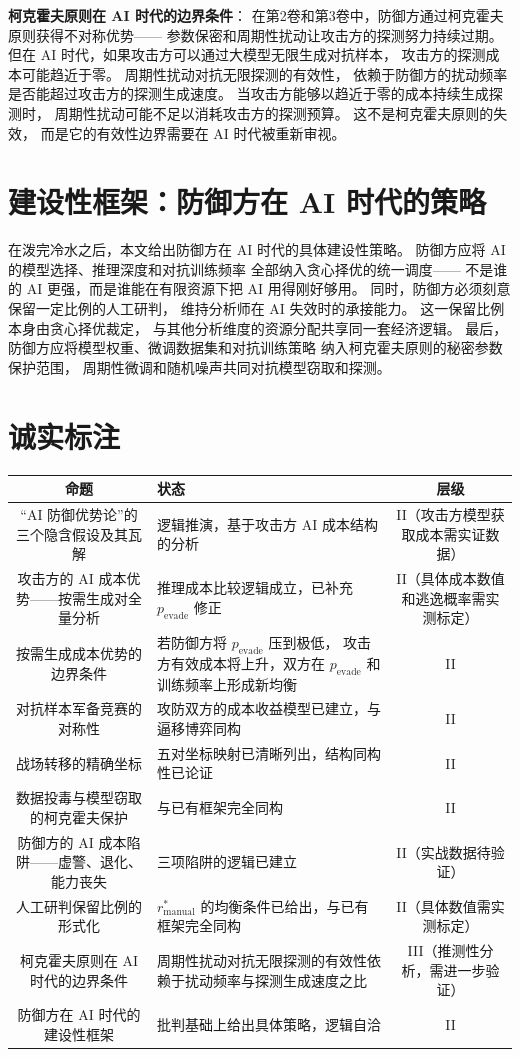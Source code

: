 \documentclass[11pt,a4paper]{article}
\begin{document}
\textbf{柯克霍夫原则在 AI 时代的边界条件}：
在第2卷和第3卷中，防御方通过柯克霍夫原则获得不对称优势——
参数保密和周期性扰动让攻击方的探测努力持续过期。
但在 AI 时代，如果攻击方可以通过大模型无限生成对抗样本，
攻击方的探测成本可能趋近于零。
周期性扰动对抗无限探测的有效性，
依赖于防御方的扰动频率是否能超过攻击方的探测生成速度。
当攻击方能够以趋近于零的成本持续生成探测时，
周期性扰动可能不足以消耗攻击方的探测预算。
这不是柯克霍夫原则的失效，
而是它的有效性边界需要在 AI 时代被重新审视。

\section{建设性框架：防御方在 AI 时代的策略}

在泼完冷水之后，本文给出防御方在 AI 时代的具体建设性策略。
防御方应将 AI 的模型选择、推理深度和对抗训练频率
全部纳入贪心择优的统一调度——
不是谁的 AI 更强，而是谁能在有限资源下把 AI 用得刚好够用。
同时，防御方必须刻意保留一定比例的人工研判，
维持分析师在 AI 失效时的承接能力。
这一保留比例本身由贪心择优裁定，
与其他分析维度的资源分配共享同一套经济逻辑。
最后，防御方应将模型权重、微调数据集和对抗训练策略
纳入柯克霍夫原则的秘密参数保护范围，
周期性微调和随机噪声共同对抗模型窃取和探测。

\section{诚实标注}

\begin{center}
\begin{xltabular}{\textwidth}{c|X|c}
\toprule
\textbf{命题} & \textbf{状态} & \textbf{层级} \\
\midrule
“AI 防御优势论”的三个隐含假设及其瓦解 &
逻辑推演，基于攻击方 AI 成本结构的分析 &
II（攻击方模型获取成本需实证数据） \\
攻击方的 AI 成本优势——按需生成对全量分析 &
推理成本比较逻辑成立，已补充 \(p_{\text{evade}}\) 修正 &
II（具体成本数值和逃逸概率需实测标定） \\
按需生成成本优势的边界条件 &
若防御方将 \(p_{\text{evade}}\) 压到极低，
攻击方有效成本将上升，双方在 \(p_{\text{evade}}\) 和训练频率上形成新均衡 &
II \\
对抗样本军备竞赛的对称性 &
攻防双方的成本收益模型已建立，与逼移博弈同构 &
II \\
战场转移的精确坐标 &
五对坐标映射已清晰列出，结构同构性已论证 &
II \\
数据投毒与模型窃取的柯克霍夫保护 &
与已有框架完全同构 &
II \\
防御方的 AI 成本陷阱——虚警、退化、能力丧失 &
三项陷阱的逻辑已建立 &
II（实战数据待验证） \\
人工研判保留比例的形式化 &
\(r_{\text{manual}}^*\) 的均衡条件已给出，与已有框架完全同构 &
II（具体数值需实测标定） \\
柯克霍夫原则在 AI 时代的边界条件 &
周期性扰动对抗无限探测的有效性依赖于扰动频率与探测生成速度之比 &
III（推测性分析，需进一步验证） \\
防御方在 AI 时代的建设性框架 &
批判基础上给出具体策略，逻辑自洽 &
II \\
\bottomrule
\end{xltabular}
\end{center}
\end{document}
